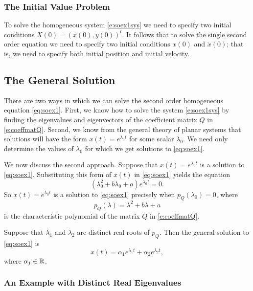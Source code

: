 \documentclass{ximera}
\begin{document}
\subsubsection*{The Initial Value Problem}

To solve the homogeneous system \eqref{e:soex1sys} we need to specify
two initial conditions $X(0)=(x(0),y(0))^t$.  It follows that to
solve the single second order equation we need to specify two initial
conditions $x(0)$ and $\dot{x}(0)$; that is, we need to specify
both initial position and
initial velocity.

\subsection*{The General Solution}

There are two ways in which we can solve
the second order homogeneous equation \eqref{eq:soex1}.  First,
we know how to solve the system \eqref{e:soex1sys} by finding the
eigenvalues and eigenvectors of the coefficient matrix $Q$ in
\eqref{e:coeffmatQ}.  Second, we know from the general theory of
planar systems that solutions will have the form $x(t)=e^{\lambda_0t}$
for some scalar $\lambda_0$.  We need only determine the values of
$\lambda_0$ for which we get solutions to \eqref{eq:soex1}.

We now discuss the second approach.  Suppose that $x(t)=e^{\lambda_0t}$
is a solution to \eqref{eq:soex1}.  Substituting this form of $x(t)$ in
\eqref{eq:soex1} yields the equation
\[
\left(\lambda_0^2 + b\lambda_0 + a\right)e^{\lambda_0t} = 0.
\]
So $x(t)=e^{\lambda_0t}$ is a solution to \eqref{eq:soex1} precisely
when $p_Q(\lambda_0)=0$, where
\begin{equation} \label{E:charQ}
p_Q(\lambda) = \lambda^2 + b\lambda + a
\end{equation}
is the characteristic polynomial of the matrix $Q$ in \eqref{e:coeffmatQ}.

Suppose that $\lambda_1$ and $\lambda_2$ are distinct real roots of $p_Q$.
Then the general solution to \eqref{eq:soex1} is
\[
x(t) = \alpha_1e^{\lambda_1t} +  \alpha_2e^{\lambda_2t},
\]
where $\alpha_j\in\mbox{$\Bbb{R}$}$.

\subsubsection*{An Example with Distinct Real Eigenvalues}
\end{document}
